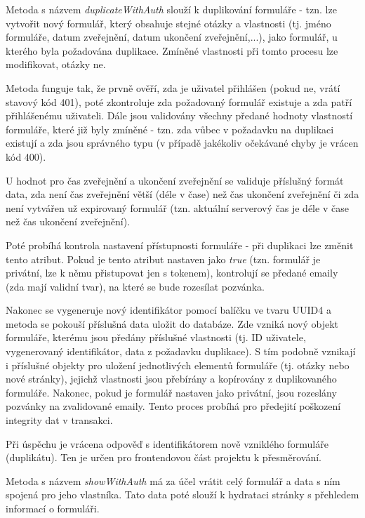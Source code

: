 			Metoda s názvem \textit{duplicateWithAuth} slouží k duplikování formuláře - tzn. lze vytvořit nový formulář, který obsahuje stejné otázky a vlastnosti (tj. jméno formuláře, datum zveřejnění, datum ukončení zveřejnění,...), jako formulář, u kterého byla požadována duplikace. Zmíněné vlastnosti při tomto procesu lze modifikovat, otázky ne.
			
			Metoda funguje tak, že prvně ověří, zda je uživatel přihlášen (pokud ne, vrátí stavový kód 401), poté zkontroluje zda požadovaný formulář existuje a zda patří přihlášenému uživateli. Dále jsou validovány všechny předané hodnoty vlastností formuláře, které již byly zmíněné - tzn. zda vůbec v požadavku na duplikaci existují a zda jsou správného typu (v případě jakékoliv očekávané chyby je vrácen kód 400). 
			
			U hodnot pro čas zveřejnění a ukončení zveřejnění se validuje příslušný formát data, zda není čas zveřejnění větší (déle v čase) než čas ukončení zveřejnění či zda není vytvářen už expirovaný formulář (tzn. aktuální serverový čas je déle v čase než čas ukončení zveřejnění). 
			
			Poté probíhá kontrola nastavení přístupnosti formuláře - při duplikaci lze změnit tento atribut. Pokud je tento atribut nastaven jako \textit{true} (tzn. formulář je privátní, lze k němu přistupovat jen s tokenem), kontrolují se předané emaily (zda mají validní tvar), na které se bude rozesílat pozvánka.
			
			Nakonec se vygeneruje nový identifikátor pomocí balíčku  ve tvaru UUID4 a metoda se pokouší příslušná data uložit do databáze. Zde vzniká nový objekt formuláře, kterému jsou předány příslušné vlastnosti (tj. ID uživatele, vygenerovaný identifikátor, data z požadavku duplikace). S tím podobně vznikají i příslušné objekty pro uložení jednotlivých elementů formuláře (tj. otázky nebo nové stránky), jejichž vlastnosti jsou přebírány a kopírovány z duplikovaného formuláře. Nakonec, pokud je formulář nastaven jako privátní, jsou rozeslány pozvánky na zvalidované emaily. Tento proces probíhá pro předejití poškození integrity dat v transakci.
			
			Při úspěchu je vrácena odpověď s identifikátorem nově vzniklého formuláře (duplikátu). Ten je určen pro frontendovou část projektu k přesměrování.
			
			Metoda s názvem \textit{showWithAuth} má za účel vrátit celý formulář a data s ním spojená pro jeho vlastníka. Tato data poté slouží k hydrataci stránky s přehledem informací o formuláři.
			
